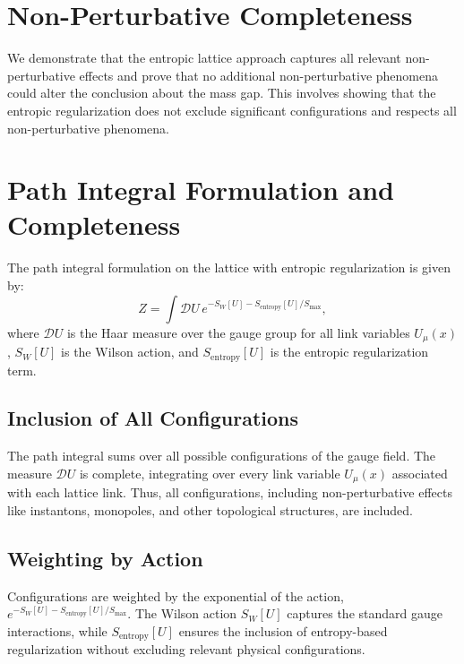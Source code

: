 \section{Non-Perturbative Completeness}

We demonstrate that the entropic lattice approach captures all relevant non-
perturbative effects and prove that no additional non-perturbative phenomena 
could alter the conclusion about the mass gap. This involves showing that the 
entropic regularization does not exclude significant configurations and respects 
all non-perturbative phenomena.



\section{Path Integral Formulation and Completeness}

The path integral formulation on the lattice with entropic regularization is given by:
\begin{equation}
Z = \int \mathcal{D}U \, e^{-S_W[U] - S_{\text{entropy}}[U]/S_{\text{max}}},
\end{equation}
where \( \mathcal{D}U \) is the Haar measure over the gauge group for all link variables \( U_\mu(x) \), \( S_W[U] \) is the Wilson action, and \( S_{\text{entropy}}[U] \) is the entropic regularization term.

\subsection{Inclusion of All Configurations}

The path integral sums over all possible configurations of the gauge field. The measure \( \mathcal{D}U \) is complete, integrating over every link variable \( U_\mu(x) \) associated with each lattice link. Thus, all configurations, including non-perturbative effects like instantons, monopoles, and other topological structures, are included.

\subsection{Weighting by Action}

Configurations are weighted by the exponential of the action, \( e^{-S_W[U] - S_{\text{entropy}}[U]/S_{\text{max}}} \). The Wilson action \( S_W[U] \) captures the standard gauge interactions, while \( S_{\text{entropy}}[U] \) ensures the inclusion of entropy-based regularization without excluding relevant physical configurations.



